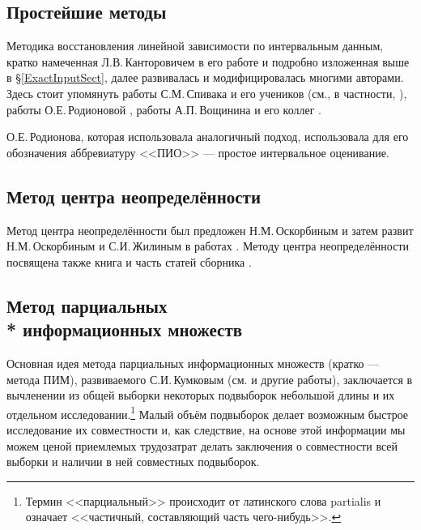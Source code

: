 \documentclass[a5paper,openany]{book}
\begin{document}
  
\subsection{Простейшие методы} 
     
Методика восстановления линейной зависимости по интервальным данным, кратко намеченная 
Л.В.\,Канторовичем в его работе \cite{Kantorovich} и подробно изложенная выше 
в \S\ref{ExactInputSect}, далее развивалась и модифицировалась многими авторами. 
Здесь стоит упомянуть работы С.М.\,Спивака и его учеников (см., в частности, 
\cite{KantorSpivak,SpivakEtAl}), работы О.Е.\,Родионовой \cite{PomeRodionova, Rodionova}, 
работы А.П.\,Вощинина и его коллег \cite{VoschininSotirov, VoschiBochkovSotirov}. 
  
О.Е.\,Родионова, которая использовала аналогичный подход, использовала для его 
обозначения аббревиатуру <<ПИО>> --- простое интервальное оценивание. 
     
  
\subsection{Метод центра неопределённости} 
  
Метод центра неопределённости был предложен Н.М.\,Оскорбиным \cite{Oskorbin1983} 
и затем развит Н.М.\,Оскорбиным и С.И.\,Жилиным в работах \cite{ZhilinDiss, 
MaksimovOskorbin, OskorbinMaksiZhilin}.     
  Методу центра неопределённости посвящена также книга \cite{SukhanovSI} 
  и часть статей сборника \cite{SukhanovSlava}. 
  
  
\subsection[Метод парциальных информационных множеств]%
           {Метод парциальных \\*  информационных множеств} 
  
Основная идея метода парциальных информационных множеств (кратко --- метода ПИМ), 
развиваемого С.И.\,Кумковым (см. \cite{Kumkov2010,Kumkov2013} и другие работы), 
заключается в вычленении из общей выборки некоторых подвыборок небольшой длины и 
их отдельном исследовании.\footnote{Термин <<парциальный>> происходит от латинского 
слова partialis и означает <<частичный, составляющий часть чего-нибудь>>.} Малый объём 
подвыборок делает возможным быстрое исследование их совместности и, как следствие, 
на основе этой информации мы можем ценой приемлемых трудозатрат делать заключения 
о совместности всей выборки и наличии в ней совместных подвыборок.  
   
\end{document}
